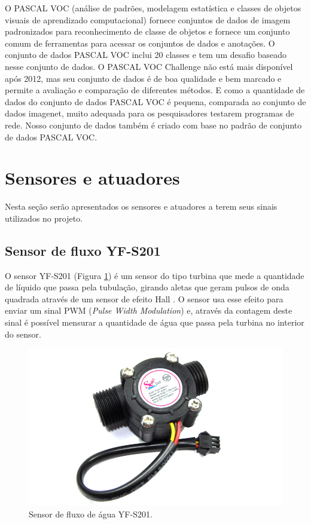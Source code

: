 O PASCAL VOC (análise de padrões, modelagem estatística e classes de objetos visuais de aprendizado computacional) \cite{everingham2007pascal} fornece conjuntos de dados de imagem padronizados para reconhecimento de classe de objetos e fornece um conjunto comum de ferramentas para acessar os conjuntos de dados e anotações. O conjunto de dados PASCAL VOC inclui 20 classes e tem um desafio baseado nesse conjunto de dados. O PASCAL VOC Challenge \cite{everingham2010pascal} não está mais disponível após 2012, mas seu conjunto de dados é de boa qualidade e bem marcado e permite a avaliação e comparação de diferentes métodos. E como a quantidade de dados do conjunto de dados PASCAL VOC é pequena, comparada ao conjunto de dados imagenet, muito adequada para os pesquisadores testarem programas de rede. Nosso conjunto de dados também é criado com base no padrão de conjunto de dados PASCAL VOC.\cite{zhou2017application}





\section{Sensores e atuadores}

Nesta seção serão apresentados os sensores e atuadores a terem seus sinais utilizados no projeto. 

\subsection{Sensor de fluxo YF-S201} \label{sec:sensor}

O sensor YF-S201 (Figura \ref{fig:sensor}) é um sensor do tipo turbina que mede a quantidade de líquido que passa pela tubulação, girando aletas que
geram pulsos de onda quadrada através de um sensor de efeito Hall \cite{roque2018sistema}. O
sensor usa esse efeito para enviar um sinal PWM (\textit{Pulse Width Modulation}) e, através da contagem deste sinal é possível mensurar a quantidade de água que passa pela turbina no interior do sensor. \cite{ms2017automaccao}

\begin{figure}[htbp]
		\centering
		\includegraphics[scale=0.3]{figuras/yf-s201.jpg}
		\caption{Sensor de fluxo de água YF-S201.}
		\label{fig:sensor}
\end{figure}

